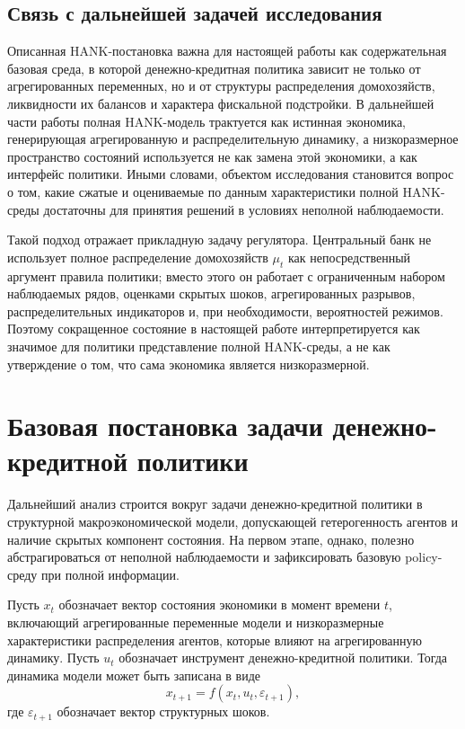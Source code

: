 \documentclass[12pt,a4paper]{article}
\begin{document}
\subsection{Связь с дальнейшей задачей исследования}

Описанная HANK-постановка важна для настоящей работы как содержательная базовая среда, в которой денежно-кредитная политика зависит не только от агрегированных переменных, но и от структуры распределения домохозяйств, ликвидности их балансов и характера фискальной подстройки. В дальнейшей части работы полная HANK-модель трактуется как истинная экономика, генерирующая агрегированную и распределительную динамику, а низкоразмерное пространство состояний используется не как замена этой экономики, а как интерфейс политики. Иными словами, объектом исследования становится вопрос о том, какие сжатые и оцениваемые по данным характеристики полной HANK-среды достаточны для принятия решений в условиях неполной наблюдаемости.

Такой подход отражает прикладную задачу регулятора. Центральный банк не использует полное распределение домохозяйств $\mu_t$ как непосредственный аргумент правила политики; вместо этого он работает с ограниченным набором наблюдаемых рядов, оценками скрытых шоков, агрегированных разрывов, распределительных индикаторов и, при необходимости, вероятностей режимов. Поэтому сокращенное состояние в настоящей работе интерпретируется как значимое для политики представление полной HANK-среды, а не как утверждение о том, что сама экономика является низкоразмерной.

\section{Базовая постановка задачи денежно-кредитной политики}

Дальнейший анализ строится вокруг задачи денежно-кредитной политики в структурной макроэкономической модели, допускающей гетерогенность агентов и наличие скрытых компонент состояния. На первом этапе, однако, полезно абстрагироваться от неполной наблюдаемости и зафиксировать базовую policy-среду при полной информации.

Пусть $x_t$ обозначает вектор состояния экономики в момент времени $t$, включающий агрегированные переменные модели и низкоразмерные характеристики распределения агентов, которые влияют на агрегированную динамику. Пусть $u_t$ обозначает инструмент денежно-кредитной политики. Тогда динамика модели может быть записана в виде
\[
x_{t+1}=f(x_t,u_t,\varepsilon_{t+1}),
\]
где $\varepsilon_{t+1}$ обозначает вектор структурных шоков.
\end{document}

